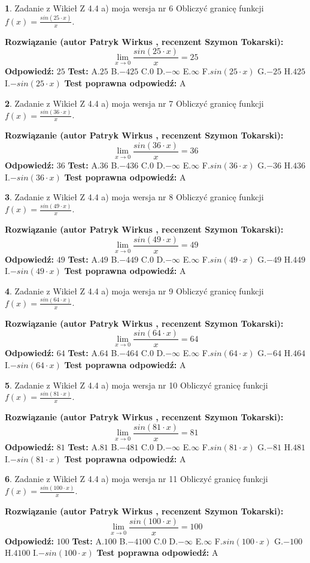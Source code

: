 \documentclass[12pt, a4paper]{article}
\theoremstyle{definition} %
\newtheorem{zad}{}
\newcommand{\zadStart}[1]{\begin{zad}#1\newline}
\newcommand{\zadStop}{\end{zad}}
\newcommand{\rozwStart}[2]{\noindent \textbf{Rozwiązanie (autor #1 , recenzent #2): }\newline}
\newcommand{\rozwStop}{\newline}
\newcommand{\odpStart}{\noindent \textbf{Odpowiedź:}\newline}
\newcommand{\odpStop}{\newline}
\newcommand{\testStart}{\noindent \textbf{Test:}\newline}
\newcommand{\testStop}{\newline}
\newcommand{\kluczStart}{\noindent \textbf{Test poprawna odpowiedź:}\newline}
\newcommand{\kluczStop}{\newline}
\begin{document}
\zadStart{Zadanie z Wikieł Z 4.4 a) moja wersja nr 6}
Obliczyć granicę funkcji $f(x)=\frac{sin(25\cdot x)}{x}$.
\zadStop
\rozwStart{Patryk Wirkus}{Szymon Tokarski}
$$\lim\limits_{x\to 0}\frac{sin(25\cdot x)}{x}=
25$$
\rozwStop
\odpStart
$25$
\odpStop
\testStart
A.$25$
B.$-425$
C.$0$
D.$-\infty$
E.$\infty$
F.$sin(25\cdot x)$
G.$-25$
H.$425$
I.$-sin(25\cdot x)$
\testStop
\kluczStart
A
\kluczStop



\zadStart{Zadanie z Wikieł Z 4.4 a) moja wersja nr 7}
Obliczyć granicę funkcji $f(x)=\frac{sin(36\cdot x)}{x}$.
\zadStop
\rozwStart{Patryk Wirkus}{Szymon Tokarski}
$$\lim\limits_{x\to 0}\frac{sin(36\cdot x)}{x}=
36$$
\rozwStop
\odpStart
$36$
\odpStop
\testStart
A.$36$
B.$-436$
C.$0$
D.$-\infty$
E.$\infty$
F.$sin(36\cdot x)$
G.$-36$
H.$436$
I.$-sin(36\cdot x)$
\testStop
\kluczStart
A
\kluczStop



\zadStart{Zadanie z Wikieł Z 4.4 a) moja wersja nr 8}
Obliczyć granicę funkcji $f(x)=\frac{sin(49\cdot x)}{x}$.
\zadStop
\rozwStart{Patryk Wirkus}{Szymon Tokarski}
$$\lim\limits_{x\to 0}\frac{sin(49\cdot x)}{x}=
49$$
\rozwStop
\odpStart
$49$
\odpStop
\testStart
A.$49$
B.$-449$
C.$0$
D.$-\infty$
E.$\infty$
F.$sin(49\cdot x)$
G.$-49$
H.$449$
I.$-sin(49\cdot x)$
\testStop
\kluczStart
A
\kluczStop



\zadStart{Zadanie z Wikieł Z 4.4 a) moja wersja nr 9}
Obliczyć granicę funkcji $f(x)=\frac{sin(64\cdot x)}{x}$.
\zadStop
\rozwStart{Patryk Wirkus}{Szymon Tokarski}
$$\lim\limits_{x\to 0}\frac{sin(64\cdot x)}{x}=
64$$
\rozwStop
\odpStart
$64$
\odpStop
\testStart
A.$64$
B.$-464$
C.$0$
D.$-\infty$
E.$\infty$
F.$sin(64\cdot x)$
G.$-64$
H.$464$
I.$-sin(64\cdot x)$
\testStop
\kluczStart
A
\kluczStop



\zadStart{Zadanie z Wikieł Z 4.4 a) moja wersja nr 10}
Obliczyć granicę funkcji $f(x)=\frac{sin(81\cdot x)}{x}$.
\zadStop
\rozwStart{Patryk Wirkus}{Szymon Tokarski}
$$\lim\limits_{x\to 0}\frac{sin(81\cdot x)}{x}=
81$$
\rozwStop
\odpStart
$81$
\odpStop
\testStart
A.$81$
B.$-481$
C.$0$
D.$-\infty$
E.$\infty$
F.$sin(81\cdot x)$
G.$-81$
H.$481$
I.$-sin(81\cdot x)$
\testStop
\kluczStart
A
\kluczStop



\zadStart{Zadanie z Wikieł Z 4.4 a) moja wersja nr 11}
Obliczyć granicę funkcji $f(x)=\frac{sin(100\cdot x)}{x}$.
\zadStop
\rozwStart{Patryk Wirkus}{Szymon Tokarski}
$$\lim\limits_{x\to 0}\frac{sin(100\cdot x)}{x}=
100$$
\rozwStop
\odpStart
$100$
\odpStop
\testStart
A.$100$
B.$-4100$
C.$0$
D.$-\infty$
E.$\infty$
F.$sin(100\cdot x)$
G.$-100$
H.$4100$
I.$-sin(100\cdot x)$
\testStop
\kluczStart
A
\kluczStop
\end{document}
